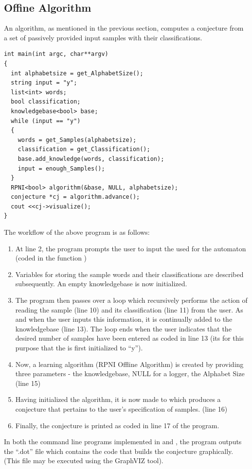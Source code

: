 \subsection{Offine Algorithm}

An \offline algorithm, as mentioned in the previous section, computes a conjecture from a set of passively provided input samples with their classifications.

\lstset{language=c++, numbers=left, numberstyle=\tiny, stepnumber=1, numbersep=5pt}
\begin{lstlisting}[frame=single]
int main(int argc, char**argv) 
{
  int alphabetsize = get_AlphabetSize();
  string input = "y";
  list<int> words;
  bool classification;
  knowledgebase<bool> base; 
  while (input == "y") 
  {
    words = get_Samples(alphabetsize);
    classification = get_Classification();
    base.add_knowledge(words, classification);
    input = enough_Samples();
  }
  RPNI<bool> algorithm(&base, NULL, alphabetsize);
  conjecture *cj = algorithm.advance();
  cout <<cj->visualize();
}
\end{lstlisting}

The workflow of the above program is as follows:

\begin{enumerate}

\item At line 2, the program prompts the user to input the \alphsize used for the automaton (coded in the function \getsize)
\item Variables for storing the sample words and their classifications are described subsequently. An empty knowledgebase is now initialized. 
\item The program then passes over a loop which recursively performs the action of reading the sample (line 10) and its classification (line 11) from the user. As and when the user inputs this information, it is continually added to the knowledgebase (line 13). The loop ends when the user indicates that the desired number of samples have been entered as coded in line 13 (its for this purpose that the \stringtype {} is first initialized to ``y'').
\item Now, a learning algorithm (RPNI Offline Algorithm) is created by providing three parameters - the knowledgebase, NULL for a logger, the Alphabet Size (line 15)
\item Having initialized the algorithm, it is now made to \advanced which produces a conjecture that pertains to the user's specification of samples. (line 16)
\item Finally, the conjecture is printed as coded in line 17 of the program.

\end{enumerate}

In both the command line programs implemented in \cpp and \java, the program outputs the ``.dot'' file which contains the code that builds the conjecture graphically. (This file may be executed using the GraphVIZ tool).



